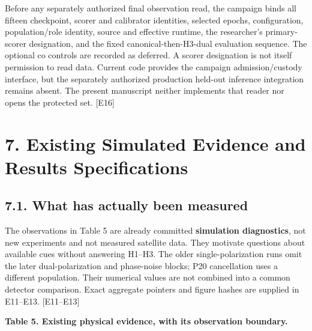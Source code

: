 \documentclass[
  10pt,
]{article}
\begin{document}
Before any separately authorized final observation read, the campaign
binds all fifteen checkpoint, scorer and calibrator identities, selected
epochs, configuration, population/role identity, source and effective
runtime, the researcher's primary-scorer designation, and the fixed
canonical-then-H3-dual evaluation sequence. The optional co controls are
recorded as deferred. A scorer designation is not itself permission to
read data. Current code provides the campaign admission/custody
interface, but the separately authorized production held-out inference
integration remains absent. The present manuscript neither implements
that reader nor opens the protected set. {[}E16{]}

\section{7. Existing Simulated Evidence and Results
Specifications}\label{existing-simulated-evidence-and-results-specifications}

\subsection{7.1. What has actually been
measured}\label{what-has-actually-been-measured}

The observations in Table 5 are already committed \textbf{simulation
diagnostics}, not new experiments and not measured satellite data. They
motivate questions about available cues without answering H1--H3. The
older single-polarization runs omit the later dual-polarization and
phase-noise blocks; P20 cancellation uses a different population. Their
numerical values are not combined into a common detector comparison.
Exact aggregate pointers and figure hashes are supplied in E11--E13.
{[}E11--E13{]}

\textbf{Table 5. Existing physical evidence, with its observation
boundary.}
\end{document}
